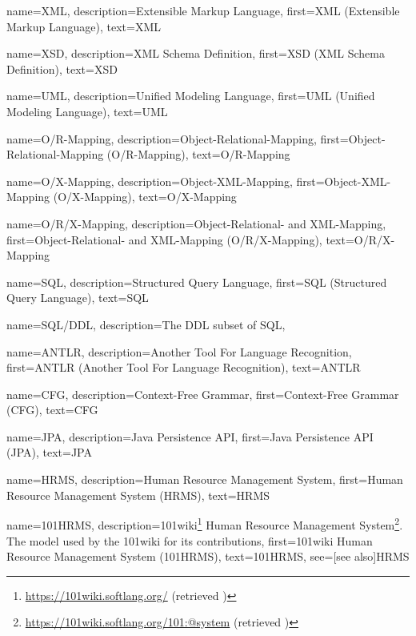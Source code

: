 {
    name=XML,
    description={Extensible Markup Language},
    first={XML (Extensible Markup Language)},
    text={XML}
}

{
    name=XSD,
    description={XML Schema Definition},
    first={XSD (XML Schema Definition)},
    text={XSD}
}

{
    name=UML,
    description={Unified Modeling Language},
    first={UML (Unified Modeling Language)},
    text={UML}
}

{
    name=O/R-Mapping,
    description={Object-Relational-Mapping},
    first={Object-Relational-Mapping (O/R-Mapping)},
    text={O/R-Mapping}
}

{
    name=O/X-Mapping,
    description={Object-XML-Mapping},
    first={Object-XML-Mapping (O/X-Mapping)},
    text={O/X-Mapping}
}

{
    name=O/R/X-Mapping,
    description={Object-Relational- and XML-Mapping},
    first={Object-Relational- and XML-Mapping (O/R/X-Mapping)},
    text={O/R/X-Mapping}
}

{
    name=SQL,
    description={Structured Query Language},
    first={SQL (Structured Query Language)},
    text={SQL}
}

{
    name=SQL/DDL,
    description={The DDL subset of SQL},
}

{
    name=ANTLR,
    description={Another Tool For Language Recognition},
    first={ANTLR (Another Tool For Language Recognition)},
    text={ANTLR}
}

{
    name=CFG,
    description={Context-Free Grammar},
    first={Context-Free Grammar (CFG)},
    text={CFG}
}

{
    name=JPA,
    description={Java Persistence API},
    first={Java Persistence API (JPA)},
    text={JPA}
}

{
    name=HRMS,
    description={Human Resource Management System},
    first={Human Resource Management System (HRMS)},
    text={HRMS}
}

{
    name=101HRMS,
    description={101wiki\footnote{\url{https://101wiki.softlang.org/} (retrieved )} Human Resource Management System\footnote{\url{https://101wiki.softlang.org/101:@system} (retrieved )}. The model used by the 101wiki for its contributions},
    first={101wiki Human Resource Management System (101HRMS)},
    text={101HRMS},
    see=[see also]{HRMS}
}

